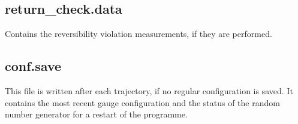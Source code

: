 \subsection*{\ttfamily return\_check.data}
Contains the reversibility violation measurements, if they are
performed. 

\subsection*{\ttfamily conf.save}
This file is written after each trajectory, if no regular
configuration is saved. It contains the most recent gauge
configuration and the status of the random number generator for a
restart of the programme. 


